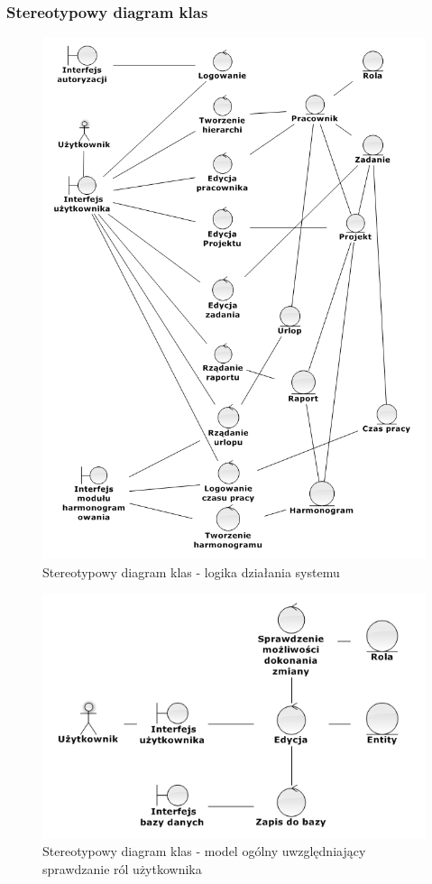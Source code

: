 \subsubsection{Stereotypowy diagram klas}
\begin{figure}[H]
    \centering
    \includegraphics[scale=0.8]{diagramy/modelKlas/Robustnessdiagram1.png}
    \caption{Stereotypowy diagram klas - logika działania systemu}
    \label{fig:logika}
\end{figure}
\begin{figure}[H]
    \centering
    \includegraphics[scale=0.8]{diagramy/modelKlas/Robustnessdiagram2.png}
    \caption{Stereotypowy diagram klas - model ogólny uwzględniający sprawdzanie ról użytkownika}
    \label{fig:ogolny}
\end{figure}

